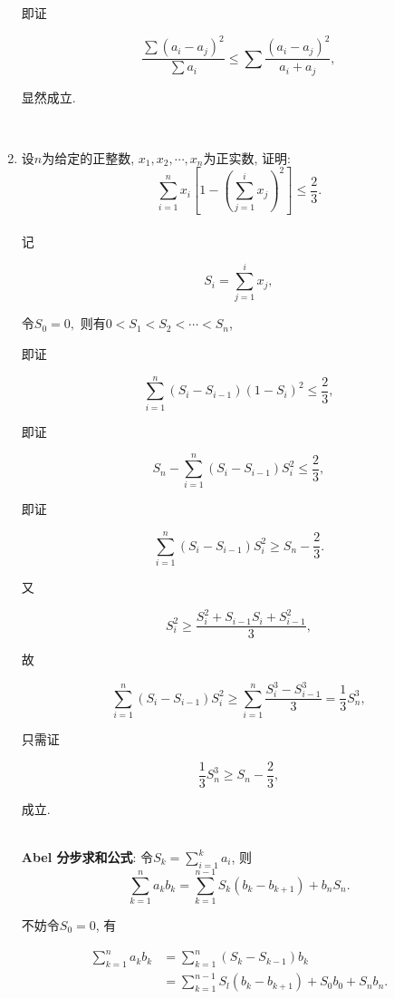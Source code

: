 \documentclass[8pt]{article}
\begin{document}
\begin{enumerate}
			即证

			$$\frac{\sum (a_i - a_j)^2}{\sum a_i} \leq \sum \frac{(a_i - a_j)^2}{a_i + a_j},$$

			显然成立.

		~\\

		\item 设$n$为给定的正整数, $x_1, x_2, \cdots, x_n$为正实数, 证明: $$\sum_{i=1}^{n} x_i \left[1-\left(\sum_{j=1}^{i} x_j\right)^2\right] \leq \frac{2}{3}.$$
			~\\

			记

			$$S_i = \sum_{j=1}^{i} x_j,$$

			令$S_0 = 0,$ 则有$0< S_1 < S_2 < \cdots < S_n$,

			即证

			$$\sum_{i=1}^{n} \left(S_i - S_{i-1}\right) \left(1 - S_i\right)^2 \leq \frac{2}{3},$$

			即证

			$$S_n - \sum_{i=1}^{n} \left(S_i - S_{i-1}\right) S_i^2 \leq \frac{2}{3},$$

			即证

			$$\sum_{i=1}^{n} \left(S_i - S_{i-1}\right) S_i^2 \geq S_n - \frac{2}{3}.$$

			又

			$$S_i^2 \geq \frac{S_i^2 + S_{i-1} S_i + S_{i-1}^2}{3},$$

			故

			$$\sum_{i=1}^{n} \left(S_i - S_{i-1}\right) S_i^2 \geq \sum_{i=1}^{n} \frac{S_i^3 - S_{i-1}^3}{3}=\frac{1}{3} S_n^3,$$

			只需证

			$$\frac{1}{3} S_n^3 \geq S_n - \frac{2}{3},$$

			成立.

		~\\

		\textbf{Abel 分步求和公式}: 令$S_k = \displaystyle\sum_{i=1}^{k} a_i$, 则$$\sum_{k=1}^{n} a_k b_k = \sum_{k=1}^{n-1} S_k \left(b_k - b_{k+1}\right) + b_n S_n.$$

		不妨令$S_0 = 0$, 有

		\begin{align*}
			\sum_{k=1}^{n} a_k b_k &= \sum_{k=1}^{n} \left(S_k - S_{k-1}\right) b_k\\
			&= \sum_{k=1}^{n-1} S_l \left(b_k - b_{k+1}\right) + S_0 b_0 + S_n b_n.
		\end{align*}

		~\\


\end{enumerate}
\end{document}
